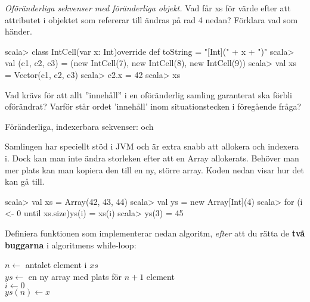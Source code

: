 

\Exercise{\ExeWeekFIVE}

\begin{Goals}
\item 
\end{Goals}

\begin{Preparations}
\item 
\end{Preparations}

\BasicTasks %

\Task \emph{Oföränderliga sekvenser med föränderliga objekt.} 
\Subtask Vad får xs för värde efter att attributet i objektet som  refererar till ändras på rad 4 nedan? Förklara vad som händer.
\begin{REPL}
scala> class IntCell(var x: Int){override def toString = "[Int](" + x + ")"}
scala> val (c1, c2, c3) = (new IntCell(7), new IntCell(8), new IntCell(9))
scala> val xs = Vector(c1, c2, c3)
scala> c2.x = 42
scala> xs
\end{REPL}
\Subtask Vad krävs för att allt ''innehåll'' i en oföränderlig samling garanterat ska förbli oförändrat? 
\Subtask Varför står ordet 'innehåll' inom situationstecken i föregående fråga?

\Task Föränderliga, indexerbara sekvenser:  och 

\Subtask Samlingen  har speciellt stöd i JVM och är extra snabb att allokera och indexera i. Dock kan man inte ändra storleken efter att en Array allokerats. Behöver man mer plats kan man kopiera den till en ny, större array. Koden nedan visar hur det kan gå till.
\begin{REPL}
scala> val xs = Array(42, 43, 44)
scala> val ys = new Array[Int](4)
scala> for (i <- 0 until xs.size){ys(i) = xs(i)}
scala> ys(3) = 45
\end{REPL}
Definiera funktionen  som implementerar nedan algoritm, \emph{efter} att du rätta de \textbf{två buggarna} i algoritmens while-loop:

\begin{algorithm}[H]
 
 $n \leftarrow$ antalet element i $xs$ \\
 $ys \leftarrow$ en ny array med plats för $n + 1$ element\\
 $i \leftarrow 0$  \\
 $ys(n) \leftarrow x$ 
\end{algorithm}



